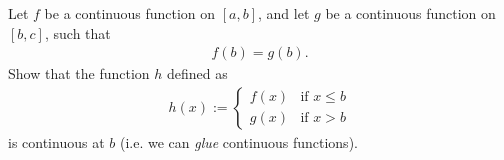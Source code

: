 \begin{exercise}
  \label{q:for_later_3}
  Let $f$ be a continuous function on $[a,b]$, and let $g$ be a continuous function on $[b,c]$, such that \begin{align*}
    f(b) = g(b).
  \end{align*}
  Show that the function $h$ defined as
  \begin{align*}
    h(x) :=
    \begin{cases}
      f(x) & \mbox{if } x \le b \\
      g(x) & \mbox{if } x > b
    \end{cases}
  \end{align*}
  is continuous at $b$ (i.e. we can {\it glue} continuous functions).
\end{exercise}
